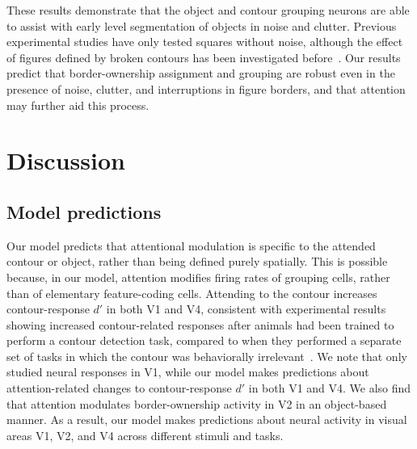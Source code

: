 These results demonstrate that the object and contour grouping neurons
are able to assist with early level segmentation of objects in noise
and clutter.  Previous experimental studies have only tested squares
without noise, although the effect of figures defined by broken contours has been investigated before~\citep{Zhang_vonderHeydt10}.
Our results predict that border-ownership assignment and grouping are
robust even in the presence of noise,  clutter, and interruptions in figure borders, and that attention may further aid this process.

\section{Discussion}
\label{sec:discussion}


\subsection{Model predictions}

Our model predicts that attentional modulation is specific to the
attended contour or object, rather than being defined purely spatially. This is possible because, in our model, attention modifies firing rates of grouping cells, rather than of elementary feature-coding cells. Attending to the contour increases contour-response $d'$ in both V1 and V4, consistent with experimental results showing increased contour-related responses after animals had been trained to perform a contour detection task, compared to when they performed a separate set of tasks in which the contour was behaviorally irrelevant~\citep{Li_etal08a}. We note that \cite{Li_etal08a} only studied neural responses in V1, while our model makes predictions about attention-related changes to contour-response $d'$ in both V1 and V4.  We also find that attention modulates border-ownership activity in V2 in an object-based manner. As a result, our model makes predictions about neural activity in visual areas V1, V2, and V4 across different stimuli and tasks.

